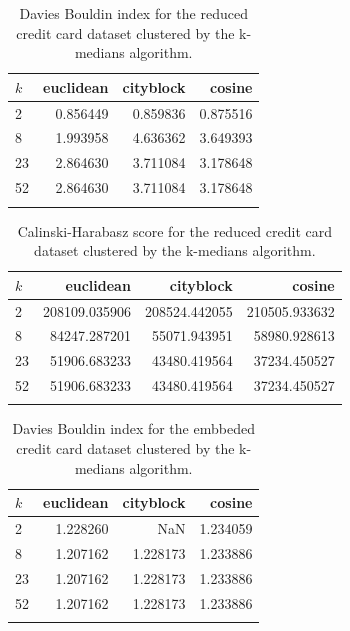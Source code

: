 \begin{table}[ht!]
    \centering
     \begin{tabular}{lrrr}
\toprule
$k$ &  euclidean &  cityblock &    cosine \\
\midrule
2  &   0.856449 &   0.859836 &  0.875516 \\
8  &   1.993958 &   4.636362 &  3.649393 \\
23 &   2.864630 &   3.711084 &  3.178648 \\
52 &   2.864630 &   3.711084 &  3.178648 \\
\bottomrule \\
\end{tabular}
    \caption{Davies Bouldin index for the reduced credit card dataset clustered by the k-medians algorithm.}
    \label{tab:c2_db_km}
\end{table}

\begin{table}[ht!]
    \centering
    \begin{tabular}{lrrr}
\toprule
$k$ &      euclidean &      cityblock &         cosine \\
\midrule
2  &  208109.035906 &  208524.442055 &  210505.933632 \\
8  &   84247.287201 &   55071.943951 &   58980.928613 \\
23 &   51906.683233 &   43480.419564 &   37234.450527 \\
52 &   51906.683233 &   43480.419564 &   37234.450527 \\
\bottomrule \\
\end{tabular}
    \caption{Calinski-Harabasz score for the reduced credit card dataset clustered by the k-medians algorithm.}
    \label{tab:c2_ch_km}
\end{table}

\begin{table}[ht!]
    \centering
    \begin{tabular}{lrrr}
\toprule
$k$ &  euclidean &  cityblock &    cosine \\
\midrule
2  &   1.228260 &        NaN &  1.234059 \\
8  &   1.207162 &   1.228173 &  1.233886 \\
23 &   1.207162 &   1.228173 &  1.233886 \\
52 &   1.207162 &   1.228173 &  1.233886 \\
\bottomrule \\
\end{tabular}
    \caption{Davies Bouldin index for the embbeded credit card dataset clustered by the k-medians algorithm.}
    \label{tab:ce_db_km}
\end{table}

